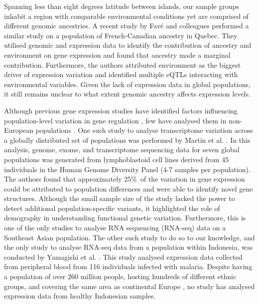 \documentclass[12pt,a4paper,titlepage,twoside,openright]{book}
\begin{document}
\begin{mainmatter}
{Spanning less than eight degrees latitude between islands, our sample groups inhabit a region with comparable environmental conditions yet are comprised of different genomic ancestries. A recent study by Fav\'e and colleagues \cite{fave2018gene} performed a similar study on a population of French-Canadian ancestry in Quebec. They utilised genomic and expression data to identify the contribution of ancestry and environment on gene expression and found that ancestry made a marginal contribution. Furthermore, the authors attributed environment as the biggest driver of expression variation and identified multiple eQTLs interacting with environmental variables. Given the lack of expression data in global populations, it still remains unclear to what extent genomic ancestry affects expression levels. 

Although previous gene expression studies have identified factors influencing population-level variation in gene regulation \cite{battle2014characterizing, westra2013systematic}, few have analysed them in non-European populations \cite{martin2014transcriptome, quach2016genetic}. One such study to analyse transcriptome variation across a globally distributed set of populations was performed by Martin et al. \cite{martin2014transcriptome}. In this analysis, genome, exome, and transcriptome sequencing data for seven global populations was generated from lymphoblastoid cell lines derived from 45 individuals in the Human Genome Diversity Panel (4-7 samples per population). The authors found that approximately 25\%\ of the variation in gene expression could be attributed to population differences and were able to identify novel gene structures. Although the small sample size of the study lacked the power to detect additional population-specific variants, it highlighted the role of demography in understanding functional genetic variation. Furthermore, this is one of the only studies to analyse RNA sequencing (RNA-seq) data on a Southeast Asian population. The other such study to do so to our knowledge, and the only study to analyse RNA-seq data from a population within Indonesia, was conducted by Yamagishi et al. \cite{yamagishi2014interactive}. This study analysed expression data collected from peripheral blood from 116 individuals infected with malaria. Despite having a population of over 260 million people, hosting hundreds of different ethnic groups, and covering the same area as continental Europe \cite{hudjashov2017complex}, no study has analysed expression data from healthy Indonesian samples.

}
\end{mainmatter}
\end{document}
